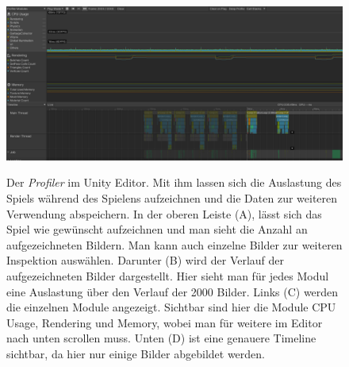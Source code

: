 \begin{figure}[H]
\centering
\begin{annotatedFigure}
	{\includegraphics[scale=0.428]{Bilder/Profiler.png}}
\end{annotatedFigure}
\caption[Der \textit{Profiler} im Unity Editor]{Der \textit{Profiler} im Unity Editor. Mit ihm lassen sich die Auslastung des Spiels während des Spielens aufzeichnen und die Daten zur weiteren Verwendung abspeichern. In der oberen Leiste (A), lässt sich das Spiel wie gewünscht aufzeichnen und man sieht die Anzahl an aufgezeichneten Bildern. Man kann auch einzelne Bilder zur weiteren Inspektion auswählen. Darunter (B) wird der Verlauf der aufgezeichneten Bilder dargestellt. Hier sieht man für jedes Modul eine Auslastung über den Verlauf der 2000 Bilder. Links (C) werden die einzelnen Module angezeigt. Sichtbar sind hier die Module CPU Usage, Rendering und Memory, wobei man für weitere im Editor nach unten scrollen muss. Unten (D) ist eine genauere Timeline sichtbar, da hier nur einige Bilder abgebildet werden.}
\label{fig:profiler}
\end{figure}